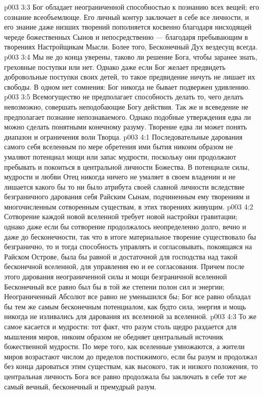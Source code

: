 \vs p003 3:3 Бог обладает неограниченной способностью к познанию всех вещей; его сознание всеобъемлюще. Его личный контур заключает в себе все личности, и его знание даже низших творений пополняется косвенно благодаря нисходящей череде божественных Сынов и непосредственно --- благодаря пребывающим в творениях Настройщикам Мысли. Более того, Бесконечный Дух вездесущ всегда.
\vs p003 3:4 Мы не до конца уверены, таково ли решение Бога, чтобы заранее знать, греховные поступки или нет. Однако даже если Бог желает предвидеть добровольные поступки своих детей, то такое предвидение ничуть не лишает их свободы. В одном нет сомнения: Бог никогда не бывает подвержен удивлению.
\vs p003 3:5 \pc Всемогущество не предполагает способность делать то, чего делать невозможно, совершать неподобающие Богу действия. Так же и всеведение не предполагает познание непознаваемого. Однако подобные утверждения едва ли можно сделать понятными конечному разуму. Творение едва ли может понять диапазон и ограничения воли Творца.
\vs p003 4:1 Последовательные дарования самого себя вселенным по мере обретения ими бытия никоим образом не умаляют потенциал мощи или запас мудрости, поскольку они продолжают пребывать и покоиться в центральной личности Божества. В потенциале силы, мудрости и любви Отец никогда ничего не умаляет в своем владении и не лишается какого бы то ни было атрибута своей славной личности вследствие безграничного дарования себя Райским Сынам, подчиненным ему творениям и многочисленным сотворенным существам, в этих творениях живущим.
\vs p003 4:2 Сотворение каждой новой вселенной требует новой настройки гравитации; однако даже если бы сотворение продолжалось неопределенно долго, вечно и даже до бесконечности, так что в итоге материальное творение существовало бы безгранично, то и тогда способность управлять и согласовывать, покоящаяся на Райском Острове, была бы равной и достаточной для господства над такой бесконечной вселенной, для управления ею и ее согласования. Причем после этого дарования неограниченной силы и мощи безграничной вселенной Бесконечный все равно был бы в той же степени полон сил и энергии; Неограниченный Абсолют все равно не уменьшился бы; Бог все равно обладал бы тем же самым бесконечным потенциалом, как будто сила, энергия и мощь никогда не изливались для дарования их вселенной за вселенной.
\vs p003 4:3 То же самое касается и мудрости: тот факт, что разум столь щедро раздается для мышления миров, никоим образом не обедняет центральный источник божественной мудрости. По мере того, как вселенные умножаются, а жители миров возрастают числом до пределов постижимого, если бы разум и продолжал без конца дароваться этим существам, как высокого, так и низкого положения, то центральная личность Бога все равно продолжала бы заключать в себе тот же самый вечный, бесконечный и премудрый разум.
